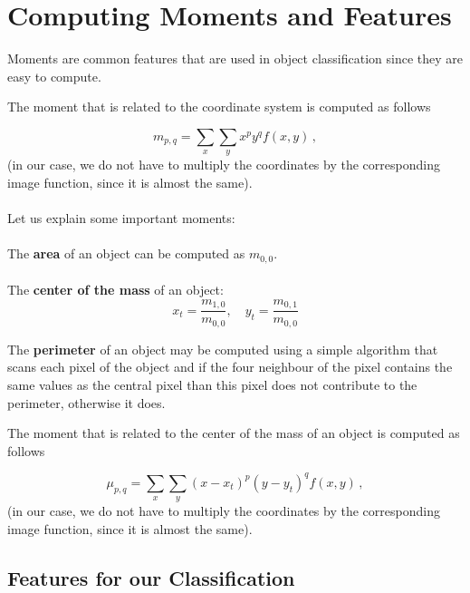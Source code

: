 \documentclass[12pt]{article}
\begin{document}
\section{Computing Moments and Features}

Moments are common features that are used in object classification since they are easy to compute.

The moment that is related to the coordinate system is computed as follows

\begin{equation}
m_{p, q} = \sum\limits_{x} \sum\limits_{y} x^p y^q f(x, y) \, ,
\end{equation}
(in our case, we do not have to multiply the coordinates by the corresponding image function, since it is almost the same).
\\
\\
Let us explain some important moments:
\\
\\
The \textbf{area} of an object can be computed as $m_{0, 0}$.
\\
\\
The \textbf{center of the mass} of an object:
\begin{equation}
x_t = \frac{m_{1, 0}}{m_{0, 0}}, \quad y_t = \frac{m_{0, 1}}{m_{0, 0}}
\end{equation}

The \textbf{perimeter} of an object may be computed using a simple algorithm that scans each pixel of the object and if the four neighbour of the pixel
contains the same values as the central pixel than this pixel does not contribute to the perimeter, otherwise it does.


The moment that is related to the center of the mass of an object is computed as follows

\begin{equation}
\mu_{p, q} = \sum\limits_{x} \sum\limits_{y} (x - x_t)^p (y - y_t)^q f(x, y) \, ,
\end{equation}
(in our case, we do not have to multiply the coordinates by the corresponding image function, since it is almost the same).

\subsection{Features for our Classification}
\end{document}
